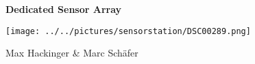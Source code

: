 %
%
\begin{titlepage}
	\begin{center}
		{\Large \bfseries Dedicated Sensor Array }
		
		\vspace{3cm}
		
		\begin{center}
			\texttt{[image: ../../pictures/sensorstation/DSC00289.png]}
		\end{center}

		\vfill
		
		
		{\normalsize \newtoday } 
		
		{\normalsize Max Hackinger \& Marc Schäfer}
		
		
		
	\end{center}
	\noindent
	\begin{flushleft} 
	\end{flushleft}
\end{titlepage}